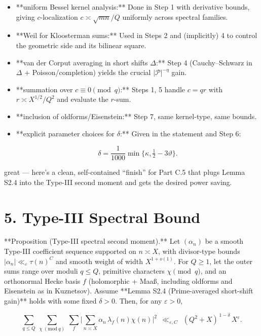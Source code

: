 \documentclass[11pt]{article}
\theoremstyle{definition}
\theoremstyle{remark}
\begin{document}
\begin{itemize}
\item **uniform Bessel kernel analysis:** Done in Step 1 with derivative bounds, giving $c$-localization $c\asymp \sqrt{mn}/Q$ uniformly across spectral families.

\item **Weil for Kloosterman sums:** Used in Steps 2 and (implicitly) 4 to control the geometric side and its bilinear square.

\item **van der Corput averaging in short shifts $\Delta$:** Step 4 (Cauchy–Schwarz in $\Delta$ + Poisson/completion) yields the crucial $|\mathcal P|^{-\eta}$ gain.

\item **summation over $c\equiv0\pmod q$:** Steps 1, 5 handle $c=qr$ with $r\asymp X^{1/2}/Q^2$ and evaluate the $r$-sum.

\item **inclusion of oldforms/Eisenstein:** Step 7, same kernel-type, same bounds.

\item **explicit parameter choices for $\delta$:** Given in the statement and Step 6:

  $$
  \delta=\frac{1}{1000}\min\{\kappa,\tfrac12-3\vartheta\}.
  $$
\end{itemize}

great — here’s a clean, self-contained “finish” for Part C.5 that plugs Lemma S2.4 into the Type-III second moment and gets the desired power saving.

\section*{5. Type-III Spectral Bound}

**Proposition (Type-III spectral second moment).**
Let $(\alpha_n)$ be a smooth Type-III coefficient sequence supported on $n\asymp X$, with divisor-type bounds $|\alpha_n|\ll_\varepsilon \tau(n)^C$ and smooth weight of width $X^{1+o(1)}$. For $Q\ge 1$, let the outer sums range over moduli $q\le Q$, primitive characters $\chi\pmod q$, and an orthonormal Hecke basis $f$ (holomorphic + Maaß, including oldforms and Eisenstein as in Kuznetsov). Assume **Lemma S2.4 (Prime-averaged short-shift gain)** holds with some fixed $\delta>0$. Then, for any $\varepsilon>0$,

$$
\sum_{q\le Q}\ \sum_{\chi\ (\mathrm{mod}\ q)}\ \sum_{f}
\Bigg|\sum_{n\asymp X}\alpha_n\,\lambda_f(n)\chi(n)\Bigg|^2
\ \ \ll_{\varepsilon,C}\ \ (Q^2+X)^{\,1-\delta}\,X^{\varepsilon}.
$$
\end{document}
